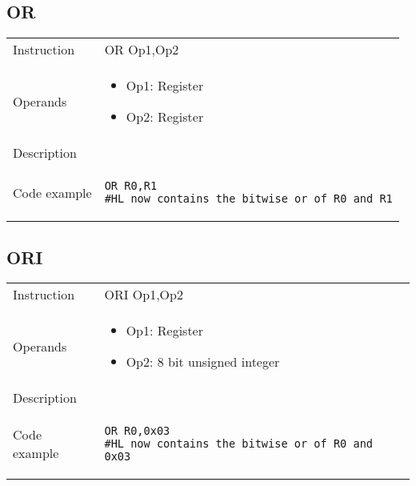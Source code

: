 \subsection{OR}
\renewcommand*{\arraystretch}{2.0}
\begin{longtable}{P{3cm}P{9cm}}
\midrule
\noindent Instruction & OR Op1,Op2 \\
\noindent Operands &
\begin{itemize}[label={},noitemsep,leftmargin=*,topsep=0pt,partopsep=0pt, itemsep=1em]
\item Op1: Register
\item Op2: Register
\end{itemize}\\
\noindent Description &  \\
\noindent Code example & 
\begin{lstlisting}
OR R0,R1
#HL now contains the bitwise or of R0 and R1
\end{lstlisting} \\
\end{longtable}


\subsection{ORI}
\renewcommand*{\arraystretch}{2.0}
\begin{longtable}{P{3cm}P{9cm}}
\midrule
\noindent Instruction & ORI Op1,Op2 \\
\noindent Operands &
\begin{itemize}[label={},noitemsep,leftmargin=*,topsep=0pt,partopsep=0pt, itemsep=1em]
\item Op1: Register
\item Op2: 8 bit unsigned integer
\end{itemize}\\
\noindent Description &  \\
\noindent Code example & 
\begin{lstlisting}
OR R0,0x03
#HL now contains the bitwise or of R0 and 0x03
\end{lstlisting} \\
\end{longtable}

\newpage

